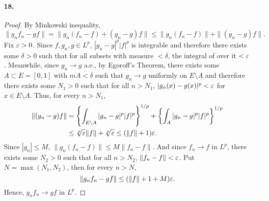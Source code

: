   \paragraph{18.}
  \begin{proof}
    By Minkowski inequality, 
    \[
      \|g_nf_n-gf\| = \|g_n(f_n-f)+(g_n-g)f\| \le \|g_n(f_n-f)\|+\|(g_n-g)f\|.
    \]
    Fix $\varepsilon>0$. Since $f,g_n,g\in L^p$, $|g_n-g|^p|f|^p$ is integrable and 
    therefore there exists some $\delta>0$ such that for all subsets with 
    measure $<\delta$, the integral of over it $<\varepsilon$. Meanwhile, since $g_n\to
    g$ a.e., by Egoroff's Theorem, there exists some $A\subset E=[0,1]$ with $mA
    <\delta$ such that $g_n\to g$ uniformly on $E\setminus A$ and therefore 
    there exists some $N_1>0$ such that for all $n>N_1$, $|g_n(x)-g(x)|^p<\varepsilon$
    for $x\in E\setminus A$. Thus, for every $n>N_1$,
    \begin{align*}
      \|(g_n-g)f\|
      &=\left\{\int_{E\setminus A}|g_n-g|^p|f|^p\right\}^{1/p} + 
        \left\{\int_A|g_n-g|^p|f|^p\right\}^{1/p} \\
      & \le \sqrt[p]{\varepsilon}\|f\| + \sqrt[p]{\varepsilon} \le (\|f\|+1)\varepsilon.
    \end{align*}
    Since $|g_n|\le M$, $\|g_n(f_n-f)\|\le M\|f_n-f\|$. And since $f_n\to f$ in 
    $L^p$, there exists some $N_2>0$ such that for all $n>N_2$, $\|f_n-f\|<
    \varepsilon$. Put $N=\max(N_1,N_2)$, then for every $n>N$,
    \[
      \|g_nf_n-gf\| \le (\|f\|+1+M)\varepsilon.
    \]
    Hence, $g_nf_n\to gf$ in $L^p$.
  \end{proof}
